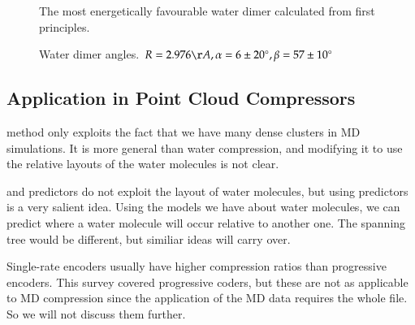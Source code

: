 \documentclass{report}
\newcommand{\degree}{\ensuremath{^\circ}}
\begin{document}
\begin{figure}[h]
\centering
{}
\caption{The most energetically favourable water dimer calculated from first
  principles.}
\label{fig:dimer}
\end{figure}

\begin{figure}[h]
\centering
{}
\caption{Water dimer angles. $R = 2.976\AA, \alpha = 6 \pm 20\degree, \beta =
  57 \pm 10\degree$}
\label{fig:dimer-angle}
\end{figure}

\subsection{Application in Point Cloud Compressors}

\citet{omeltchenko2000sls} method only exploits the fact that we have many
dense clusters in MD simulations. It is more general than water compression,
and modifying it to use the relative layouts of the water molecules is not
clear.

\citet{merrycomp} and \citet{gumholdcomp} predictors do not exploit the layout
of water molecules, but using predictors is a very salient idea. Using the
models we have about water molecules, we can predict where a water molecule
will occur relative to another one. The spanning tree would be different, but
similiar ideas will carry over.

Single-rate encoders usually have higher compression ratios than progressive
encoders. This survey covered progressive coders, but these are not as
applicable to MD compression since the application of the MD data requires the
whole file. So we will not discuss them further.
\end{document}
